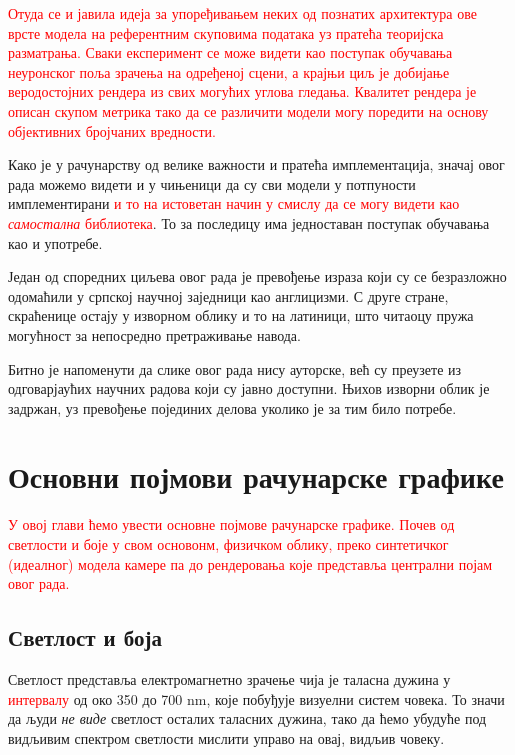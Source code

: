 \documentclass[12pt, a4paper, twoside]{book}
\numberwithin{equation}{chapter}
\numberwithin{theorem}{section}
\numberwithin{definition}{section}
\numberwithin{definitionChapter}{chapter}
\begin{document}
\textcolor{red}{Отуда се и јавила идеја за упоређивањем неких од познатих архитектура ове врсте модела
на референтним скуповима података уз пратећа теоријска разматрања. Сваки експеримент се може видети као
поступак обучавања неуронског поља зрачења на одређеној сцени, а крајњи циљ је добијање веродостојних рендера
из свих могућих углова гледања. Квалитет рендера је описан скупом метрика тако да се различити модели могу
поредити на основу објективних бројчаних вредности.}

Како је у рачунарству од велике важности и пратећа имплементација, значај овог рада можемо видети 
и у чињеници да су сви модели у потпуности имплементирани \textcolor{red}{и то на истоветан начин у смислу да се могу
видети као \textit{самостална} библиотека}. То за последицу има једноставан поступак обучавања као и употребе.

Један од споредних циљева овог рада је превођење израза који су се безразложно одомаћили
у српској научној заједници као англицизми. С друге стране, скраћенице остају у изворном
облику и то на латиници, што читаоцу пружа могућност за непосредно претраживање навода.

Битно је напоменути да слике овог рада нису ауторске, већ су преузете из одговарјаућих научних радова
који су јавно доступни. Њихов изворни облик је задржан, уз превођење појединих делова уколико је за
тим било потребе.

\chapter{Основни појмови рачунарске графике}
\textcolor{red}{У овој глави ћемо увести основне појмове рачунарске графике. Почев од светлости и
боје у свом основонм, физичком облику, преко синтетичког (идеалног) модела камере па до рендеровања
које представља централни појам овог рада.}

\section{Светлост и боја}
Светлост представља електромагнетно зрачење чија је таласна дужина у \textcolor{red}{интервалу} од око 350 до
700 nm, које побуђује визуелни систем човека. То значи да људи \textit{не виде} светлост
осталих таласних дужина, тако да ћемо убудуће под видљивим спектром светлости мислити управо
на овај, видљив човеку.

\end{document}
